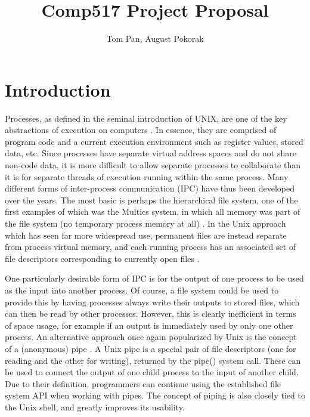 \usepackage{filecontents}

\usepackage{listings}

\title{Comp517 Project Proposal}
\author{Tom Pan, August Pokorak}



\maketitle

\section{Introduction}

Processes, as defined in the seminal introduction of UNIX, are one of the key abstractions of execution on computers \cite{unix1}.  In essence, they are comprised of program code and a current execution environment such as register values, stored data, etc.  Since processes have separate virtual address spaces and do not share non-code data, it is more difficult to allow separate processes to collaborate than it is for separate threads of execution running within the same process.  Many different forms of inter-process communication (IPC) have thus been developed over the years.  The most basic is perhaps the hierarchical file system, one of the first examples of which was the Multics system, in which all memory was part of the file system (no temporary process memory at all) \cite{multics}. In the Unix approach which has seen far more widespread use, permanent files are instead separate from process virtual memory, and each running process has an associated set of file descriptors corresponding to currently open files \cite{unix1}.

One particularly desirable form of IPC is for the output of one process to be used as the input into another process. Of course, a file system could be used to provide this by having processes always write their outputs to stored files, which can then be read by other processes.  However, this is clearly inefficient in terms of space usage, for example if an output is immediately used by only one other process. An alternative approach once again popularized by Unix is the concept of a (anonymous) pipe \cite{unix1}.  A Unix pipe is a special pair of file descriptors (one for reading and the other for writing), returned by the pipe() system call.  These can be used to connect the output of one child process to the input of another child. Due to their definition, programmers can continue using the established file system API when working with pipes. The concept of piping is also closely tied to the Unix shell, and greatly improves its usability.

